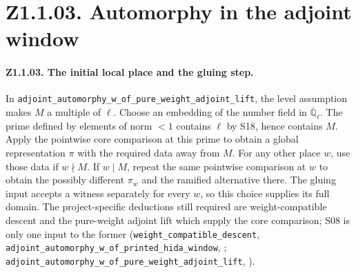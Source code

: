 \section*{Z1.1.03. Automorphy in the adjoint window}

\paragraph{Z1.1.03. The initial local place and the gluing step.}
\label{r8:small:Z1.1.03}
In \nolinkurl{adjoint_automorphy_w_of_pure_weight_adjoint_lift}, the
level assumption makes \(M\) a multiple of \(\ell\).
Choose an embedding of the number field in \(\overline{\mathbb Q}_\ell\).
The prime defined by elements of norm \(<1\) contains \(\ell\) by S18,
hence contains \(M\). Apply the pointwise core comparison at this prime to
obtain a global representation \(\pi\) with the required data away from
\(M\). For any other place \(w\), use those data if \(w\nmid M\). If
\(w\mid M\), repeat the same pointwise comparison at \(w\) to obtain
the possibly different \(\pi_w\) and the ramified alternative there.
The gluing input accepts a witness separately for every \(w\), so this
choice supplies its full domain. The project-specific deductions still
required are weight-compatible descent and the pure-weight adjoint lift
which supply the core comparison; S08 is only one input to the former
(\nolinkurl{weight_compatible_descent}, \nolinkurl{adjoint_automorphy_w_of_printed_hida_window},
;
\nolinkurl{adjoint_automorphy_w_of_pure_weight_adjoint_lift},
).

